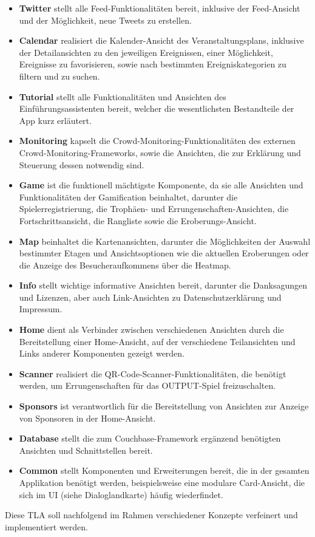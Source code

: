 \begin{itemize}
    \item \textbf{Twitter} stellt alle Feed-Funktionalitäten bereit, inklusive der Feed-Ansicht und der Möglichkeit, neue Tweets zu erstellen.
    \item \textbf{Calendar} realisiert die Kalender-Ansicht des Veranstaltungsplans, inklusive der Detailansichten zu den jeweiligen Ereignissen, einer Möglichkeit, Ereignisse zu favorisieren, sowie nach bestimmten Ereigniskategorien zu filtern und zu suchen.
    \item \textbf{Tutorial} stellt alle Funktionalitäten und Ansichten des Einführungsassistenten bereit, welcher die wesentlichsten Bestandteile der App kurz erläutert.
    \item \textbf{Monitoring} kapselt die Crowd-Monitoring-Funktionalitäten des externen Crowd-Monitoring-Frameworks, sowie die Ansichten, die zur Erklärung und Steuerung dessen notwendig sind.
    \item \textbf{Game} ist die funktionell mächtigste Komponente, da sie alle Ansichten und Funktionalitäten der Gamification beinhaltet, darunter die Spielerregistrierung, die Trophäen- und Errungenschaften-Ansichten, die Fortschrittsansicht, die Rangliste sowie die Eroberungs-Ansicht.
    \item \textbf{Map} beinhaltet die Kartenansichten, darunter die Möglichkeiten der Auswahl bestimmter Etagen und Ansichtsoptionen wie die aktuellen Eroberungen oder die Anzeige des Besucheraufkommens über die Heatmap.
    \item \textbf{Info} stellt wichtige informative Ansichten bereit, darunter die Danksagungen und Lizenzen, aber auch Link-Ansichten zu Datenschutzerklärung und Impressum.
    \item \textbf{Home} dient als Verbinder zwischen verschiedenen Ansichten durch die Bereitstellung einer Home-Ansicht, auf der verschiedene Teilansichten und Links anderer Komponenten gezeigt werden.
    \item \textbf{Scanner} realisiert die QR-Code-Scanner-Funktionalitäten, die benötigt werden, um Errungenschaften für das OUTPUT-Spiel freizuschalten.
    \item \textbf{Sponsors} ist verantwortlich für die Bereitstellung von Ansichten zur Anzeige von Sponsoren in der Home-Ansicht.
    \item \textbf{Database} stellt die zum Couchbase-Framework ergänzend benötigten Ansichten und Schnittstellen bereit.
    \item \textbf{Common} stellt Komponenten und Erweiterungen bereit, die in der gesamten Applikation benötigt werden, beispielsweise eine modulare Card-Ansicht, die sich im UI (siehe Dialoglandkarte) häufig wiederfindet.
\end{itemize}

\noindent Diese TLA soll nachfolgend im Rahmen verschiedener Konzepte verfeinert und implementiert werden.
